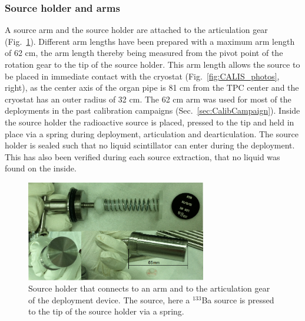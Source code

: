 \subsubsection{Source holder and arms}
A source arm and the source holder are attached to the articulation gear (Fig.~\ref{fig:SourceHolder}). Different arm lengths have been prepared with a maximum arm length of 62 cm, the arm length thereby being measured from the pivot point of the rotation gear to the tip of the source holder. This arm length allows the source to be placed in immediate contact with the cryostat (Fig.~\ref{fig:CALIS_photos}, right), as the center axis of the organ pipe is 81 cm from the TPC center and the cryostat has an outer radius of 32 cm. The 62 cm arm was used for most of the deployments in the past calibration campaigns (Sec.~\ref{sec:CalibCampaign}). Inside the source holder the radioactive source is placed, pressed to the tip and held in place via a spring during deployment, articulation and dearticulation. The source holder is sealed such that no liquid scintillator can enter during the deployment. This has also been verified during each source extraction, that no liquid was found on the inside.

\begin{figure}[htbp]
 \centering
  \includegraphics[width=0.7\textwidth]{Figures/SourceHolder.png}
  \caption{Source holder that connects to an arm and to the articulation gear of the deployment device. The source, here a $^{133}$Ba source is pressed to the tip of the source holder via a spring.}
  \label{fig:SourceHolder}
\end{figure}


